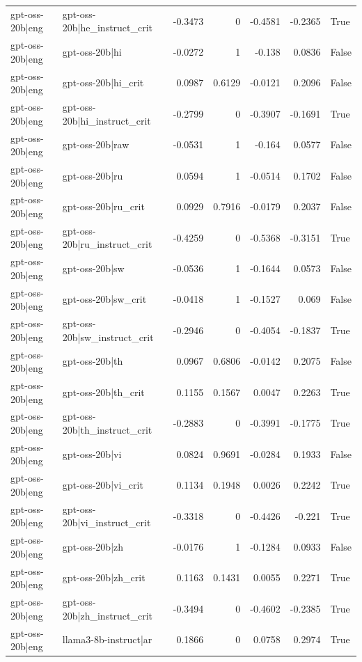 \begin{table}
\begin{tabular}{l l r r r r l}
gpt-oss-20b|eng & gpt-oss-20b|he_instruct_crit & -0.3473 & 0 & -0.4581 & -0.2365 & True \\
gpt-oss-20b|eng & gpt-oss-20b|hi & -0.0272 & 1 & -0.138 & 0.0836 & False \\
gpt-oss-20b|eng & gpt-oss-20b|hi_crit & 0.0987 & 0.6129 & -0.0121 & 0.2096 & False \\
gpt-oss-20b|eng & gpt-oss-20b|hi_instruct_crit & -0.2799 & 0 & -0.3907 & -0.1691 & True \\
gpt-oss-20b|eng & gpt-oss-20b|raw & -0.0531 & 1 & -0.164 & 0.0577 & False \\
gpt-oss-20b|eng & gpt-oss-20b|ru & 0.0594 & 1 & -0.0514 & 0.1702 & False \\
gpt-oss-20b|eng & gpt-oss-20b|ru_crit & 0.0929 & 0.7916 & -0.0179 & 0.2037 & False \\
gpt-oss-20b|eng & gpt-oss-20b|ru_instruct_crit & -0.4259 & 0 & -0.5368 & -0.3151 & True \\
gpt-oss-20b|eng & gpt-oss-20b|sw & -0.0536 & 1 & -0.1644 & 0.0573 & False \\
gpt-oss-20b|eng & gpt-oss-20b|sw_crit & -0.0418 & 1 & -0.1527 & 0.069 & False \\
gpt-oss-20b|eng & gpt-oss-20b|sw_instruct_crit & -0.2946 & 0 & -0.4054 & -0.1837 & True \\
gpt-oss-20b|eng & gpt-oss-20b|th & 0.0967 & 0.6806 & -0.0142 & 0.2075 & False \\
gpt-oss-20b|eng & gpt-oss-20b|th_crit & 0.1155 & 0.1567 & 0.0047 & 0.2263 & True \\
gpt-oss-20b|eng & gpt-oss-20b|th_instruct_crit & -0.2883 & 0 & -0.3991 & -0.1775 & True \\
gpt-oss-20b|eng & gpt-oss-20b|vi & 0.0824 & 0.9691 & -0.0284 & 0.1933 & False \\
gpt-oss-20b|eng & gpt-oss-20b|vi_crit & 0.1134 & 0.1948 & 0.0026 & 0.2242 & True \\
gpt-oss-20b|eng & gpt-oss-20b|vi_instruct_crit & -0.3318 & 0 & -0.4426 & -0.221 & True \\
gpt-oss-20b|eng & gpt-oss-20b|zh & -0.0176 & 1 & -0.1284 & 0.0933 & False \\
gpt-oss-20b|eng & gpt-oss-20b|zh_crit & 0.1163 & 0.1431 & 0.0055 & 0.2271 & True \\
gpt-oss-20b|eng & gpt-oss-20b|zh_instruct_crit & -0.3494 & 0 & -0.4602 & -0.2385 & True \\
gpt-oss-20b|eng & llama3-8b-instruct|ar & 0.1866 & 0 & 0.0758 & 0.2974 & True \\

\end{tabular}
\end{table}
